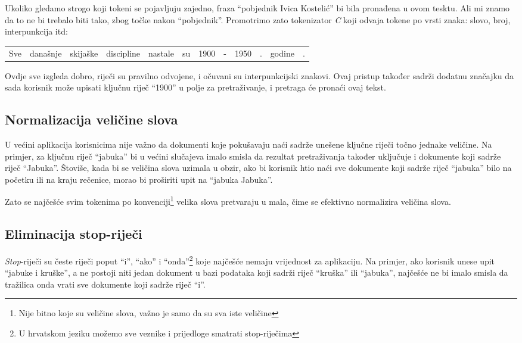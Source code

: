 \documentclass[a4paper,twoside,12pt]{scrreprt}
\newenvironment{nscenter}
 {\par\nopagebreak\centering}
 {\parskip=0pt\par\noindent\ignorespacesafterend}
\begin{document}
Ukoliko gledamo strogo koji tokeni se pojavljuju zajedno, fraza ``pobjednik Ivica Kostelić'' bi bila pronađena u ovom tesktu. Ali mi znamo da to ne bi trebalo biti tako, zbog točke nakon ``pobjednik''. Promotrimo zato tokenizator \textit{C} koji odvaja tokene po vrsti znaka: slovo, broj, interpunkcija itd:

\begin{nscenter}
  \begin{tabular}{|c|c|c|c|c|c|c|c|c|c|c|c|}
    Sve & današnje & skijaške & discipline & nastale & su & 1900 & - & 1950 & . & godine & .
  \end{tabular}
\end{nscenter}

Ovdje sve izgleda dobro, riječi su pravilno odvojene, i očuvani su interpunkcijski znakovi. Ovaj pristup također sadrži dodatnu značajku da sada korisnik može upisati ključnu riječ ``1900'' u polje za pretraživanje, i pretraga će pronaći ovaj tekst.

\subsection{Normalizacija veličine slova}

U većini aplikacija korisnicima nije važno da dokumenti koje pokušavaju naći sadrže unešene ključne riječi točno jednake veličine. Na primjer, za ključnu riječ ``jabuka'' bi u većini slučajeva imalo smisla da rezultat pretraživanja također uključuje i dokumente koji sadrže riječ ``Jabuka''. Štoviše, kada bi se veličina slova uzimala u obzir, ako bi korisnik htio naći sve dokumente koji sadrže riječ ``jabuka'' bilo na početku ili na kraju rečenice, morao bi proširiti upit na ``jabuka Jabuka''.

Zato se najčešće svim tokenima po konvenciji\footnote{Nije bitno koje su veličine slova, važno je samo da su sva iste veličine} velika slova pretvaraju u mala, čime se efektivno normalizira veličina slova.

\subsection{Eliminacija stop-riječi}

\textit{Stop}-riječi su česte riječi poput ``i'', ``ako'' i ``onda''\footnote{U hrvatskom jeziku možemo sve veznike i prijedloge smatrati stop-riječima} koje najčešće nemaju vrijednost za aplikaciju. Na primjer, ako korisnik unese upit ``jabuke i kruške'', a ne postoji niti jedan dokument u bazi podataka koji sadrži riječ ``kruška'' ili ``jabuka'', najčešće ne bi imalo smisla da tražilica onda vrati sve dokumente koji sadrže riječ ``i''.
\end{document}
